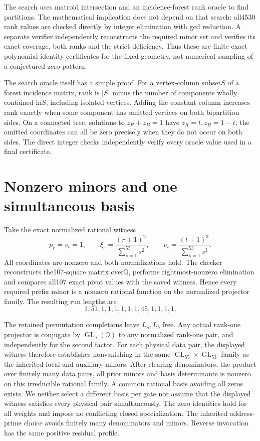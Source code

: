 \documentclass[11pt]{article}
\begin{document}
The search uses matroid intersection and an incidence-forest rank oracle to find partitions. The mathematical implication does not depend on that search: all4530 rank values are checked directly by integer elimination with gcd reduction. A separate verifier independently reconstructs the required minor set and verifies its exact coverage, both ranks and the strict deficiency. Thus these are finite exact polynomial-identity certificates for the fixed geometry, not numerical sampling of a conjectured zero pattern.

The search oracle itself has a simple proof. For a vertex-column subset$S$ of a forest incidence matrix, rank is $|S|$ minus the number of components wholly contained in$S$, including isolated vertices. Adding the constant column increases rank exactly when some component has omitted vertices on both bipartition sides. On a connected tree, solutions to $z_R+z_B=1$ have $z_R=t,z_B=1-t$; the omitted coordinates can all be zero precisely when they do not occur on both sides. The direct integer checks independently verify every oracle value used in a final certificate.

\section{Nonzero minors and one simultaneous basis}
Take the exact normalized rational witness
\[
p_r=v_t=1,\qquad
\xi_r=\frac{(r+1)^2}{\sum_{s=1}^{55}s^2},\qquad
\nu_t=\frac{(t+1)^3}{\sum_{s=1}^{53}s^3}.
\]
All coordinates are nonzero and both normalizations hold. The checker reconstructs the107-square matrix over$\mathbb Q$, performs rightmost-nonzero elimination and compares all107 exact pivot values with the saved witness. Hence every required prefix minor is a nonzero rational function on the normalized projector family. The resulting run lengths are
\[
1,51,1,1,1,1,1,1,45,1,1,1,1.
\]

The retained permutation completions leave $L_a,L_b$ free. Any actual rank-one projector is conjugate by $\operatorname{GL}_a(\mathbb Q)$ to any normalized rank-one pair, and independently for the second factor. For each physical data pair, the displayed witness therefore establishes nonvanishing in the same $\operatorname{GL}_{55}\times\operatorname{GL}_{53}$ family as the inherited local and auxiliary minors. After clearing denominators, the product over finitely many data pairs, all prior minors and basis determinants is nonzero on this irreducible rational family. A common rational basis avoiding all zeros exists. We neither select a different basis per gate nor assume that the displayed witness satisfies every physical pair simultaneously. The zero identities hold for all weights and impose no conflicting closed specialization. The inherited address-prime choice avoids finitely many denominators and minors. Reverse invocation has the same positive residual profile.
\end{document}
